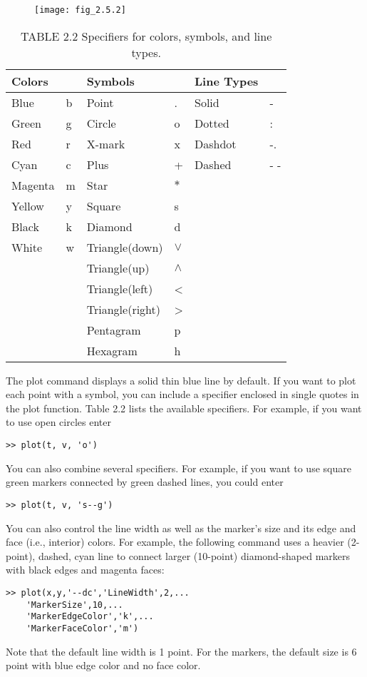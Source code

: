 \documentclass[../main.tex]{subfiles}
\begin{document}
\begin{figure}[H]
	\centering
	\texttt{[image: fig\_2.5.2]}
   
\end{figure}

\begin{table}[H]
	\caption*{TABLE 2.2 Specifiers for colors, symbols, and line types.}
	\centering
	\begin{tabular}{l l l l l l }
		\hline

		Colors && Symbols&& Line Types&\\
		\hline
		Blue& b  &Point &.  &Solid& -\\
		Green& g& Circle& o&  Dotted& :\\
		Red& r &X-mark &x &Dashdot& -.\\
		Cyan &c &Plus &+ &Dashed& - -\\
		Magenta &m &Star& $ \ast $&&\\
		Yellow& y& Square& s&& \\
		Black& k &Diamond& d&& \\
		White& w &Triangle(down)& $\vee$ && \\
		&&Triangle(up) &$\wedge$ && \\
		&&Triangle(left)& <&& \\
		&&Triangle(right) &>&& \\
		&&Pentagram& p&& \\
		&&Hexagram& h&& \\
		\hline
	\end{tabular}	
\end{table}


The plot command displays a solid thin blue line by default. If you want to plot each
point with a symbol, you can include a specifier enclosed in single quotes in the plot 
function. Table 2.2 lists the available specifiers. For example, if you want to use open circles enter
\begin{lstlisting}[frame=none, numbers=none]
	>> plot(t, v, 'o')
\end{lstlisting}
You can also combine several specifiers. For example, if you want to use square green
markers connected by green dashed lines, you could enter
\begin{lstlisting}[frame=none, numbers=none]
	>> plot(t, v, 's--g')
\end{lstlisting}
You can also control the line width as well as the marker's size and its edge and face (i.e.,
interior) colors. For example, the following command uses a heavier (2-point), dashed,
cyan line to connect larger (10-point) diamond-shaped markers with black edges and
magenta faces:
\begin{lstlisting}[frame=none, numbers=none]
	>> plot(x,y,'--dc','LineWidth',2,...
	'MarkerSize',10,...
	'MarkerEdgeColor','k',...
	'MarkerFaceColor','m')
\end{lstlisting}
Note that the default line width is 1 point. For the markers, the default size is 6 point with
blue edge color and no face color.
\end{document}

